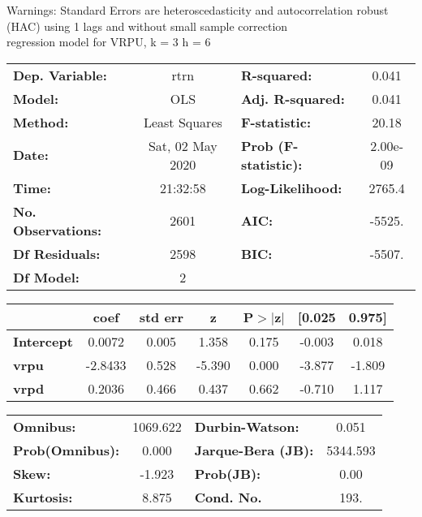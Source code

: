 Warnings: \newline
 [1] Standard Errors are heteroscedasticity and autocorrelation robust (HAC) using 1 lags and without small sample correction\\ 

regression model for VRPU, k = 3 h = 6\begin{center}
\begin{tabular}{lclc}
\toprule
\textbf{Dep. Variable:}    &       rtrn       & \textbf{  R-squared:         } &     0.041   \\
\textbf{Model:}            &       OLS        & \textbf{  Adj. R-squared:    } &     0.041   \\
\textbf{Method:}           &  Least Squares   & \textbf{  F-statistic:       } &     20.18   \\
\textbf{Date:}             & Sat, 02 May 2020 & \textbf{  Prob (F-statistic):} &  2.00e-09   \\
\textbf{Time:}             &     21:32:58     & \textbf{  Log-Likelihood:    } &    2765.4   \\
\textbf{No. Observations:} &        2601      & \textbf{  AIC:               } &    -5525.   \\
\textbf{Df Residuals:}     &        2598      & \textbf{  BIC:               } &    -5507.   \\
\textbf{Df Model:}         &           2      & \textbf{                     } &             \\
\bottomrule
\end{tabular}
\begin{tabular}{lcccccc}
                   & \textbf{coef} & \textbf{std err} & \textbf{z} & \textbf{P$> |$z$|$} & \textbf{[0.025} & \textbf{0.975]}  \\
\midrule
\textbf{Intercept} &       0.0072  &        0.005     &     1.358  &         0.175        &       -0.003    &        0.018     \\
\textbf{vrpu}      &      -2.8433  &        0.528     &    -5.390  &         0.000        &       -3.877    &       -1.809     \\
\textbf{vrpd}      &       0.2036  &        0.466     &     0.437  &         0.662        &       -0.710    &        1.117     \\
\bottomrule
\end{tabular}
\begin{tabular}{lclc}
\textbf{Omnibus:}       & 1069.622 & \textbf{  Durbin-Watson:     } &    0.051  \\
\textbf{Prob(Omnibus):} &   0.000  & \textbf{  Jarque-Bera (JB):  } & 5344.593  \\
\textbf{Skew:}          &  -1.923  & \textbf{  Prob(JB):          } &     0.00  \\
\textbf{Kurtosis:}      &   8.875  & \textbf{  Cond. No.          } &     193.  \\
\bottomrule
\end{tabular}
\end{center}

